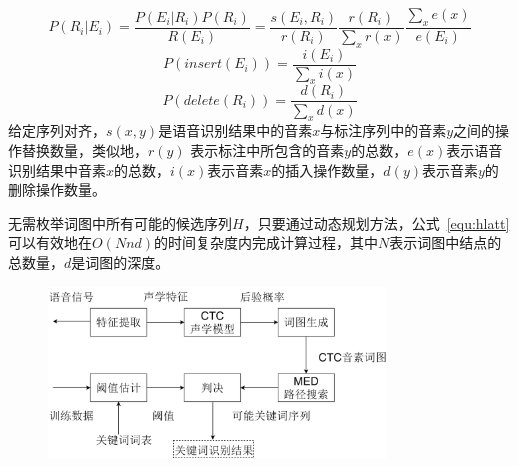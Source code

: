 \begin{equation}
P(R_{i}|E_{i}) = \frac{P(E_{i}|R_{i})P(R_{i})}{R(E_{i})}=\frac{s(E_{i},R_{i})}{r(R_{i})}\frac{r(R_{i})}{\mathop{\sum}_{x}r(x)}\frac{\mathop{\sum}_{x}e(x)}{e(E_{i})}
\end{equation}
\begin{equation}
P(insert(E_{i})) = \frac{i(E_{i})}{\mathop{\sum}_{x}i(x)}
\end{equation}
\begin{equation}
P(delete(R_{i})) = \frac{d(R_{i})}{\mathop{\sum}_{x}d(x)}
\end{equation}
给定序列对齐，$s(x,y)$是语音识别结果中的音素$x$与标注序列中的音素$y$之间的操作替换数量，类似地，$r(y)$ 表示标注中所包含的音素$y$的总数，$e(x)$表示语音识别结果中音素$x$的总数，$i(x)$表示音素$x$的插入操作数量，$d(y)$表示音素$y$的删除操作数量。

无需枚举词图中所有可能的候选序列$H$，只要通过动态规划方法，公式~\ref{equ:hlatt}可以有效地在$O(Nnd)$的时间复杂度内完成计算过程，其中$N$表示词图中结点的总数量，$d$是词图的深度。


\begin{figure}[!htp]
  \centering
    \captionstyle{\centering}
    \includegraphics[width=0.8\textwidth]{figure/kws-framework.png}
\end{figure}

